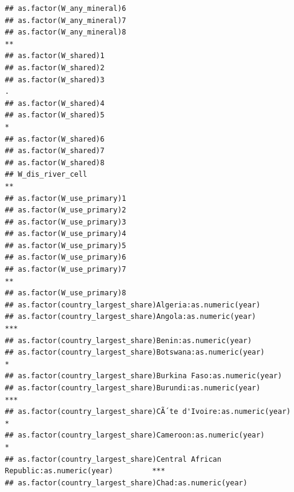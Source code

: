 \documentclass[
  a4paper,
]{article}
\begin{document}
\begin{verbatim}
## as.factor(W_any_mineral)6                                                            
## as.factor(W_any_mineral)7                                                            
## as.factor(W_any_mineral)8                                                         ** 
## as.factor(W_shared)1                                                                 
## as.factor(W_shared)2                                                                 
## as.factor(W_shared)3                                                              .  
## as.factor(W_shared)4                                                                 
## as.factor(W_shared)5                                                              *  
## as.factor(W_shared)6                                                                 
## as.factor(W_shared)7                                                                 
## as.factor(W_shared)8                                                                 
## W_dis_river_cell                                                                  ** 
## as.factor(W_use_primary)1                                                            
## as.factor(W_use_primary)2                                                            
## as.factor(W_use_primary)3                                                            
## as.factor(W_use_primary)4                                                            
## as.factor(W_use_primary)5                                                            
## as.factor(W_use_primary)6                                                            
## as.factor(W_use_primary)7                                                         ** 
## as.factor(W_use_primary)8                                                            
## as.factor(country_largest_share)Algeria:as.numeric(year)                             
## as.factor(country_largest_share)Angola:as.numeric(year)                           ***
## as.factor(country_largest_share)Benin:as.numeric(year)                               
## as.factor(country_largest_share)Botswana:as.numeric(year)                         *  
## as.factor(country_largest_share)Burkina Faso:as.numeric(year)                        
## as.factor(country_largest_share)Burundi:as.numeric(year)                          ***
## as.factor(country_largest_share)CÃ´te d'Ivoire:as.numeric(year)                   *  
## as.factor(country_largest_share)Cameroon:as.numeric(year)                         *  
## as.factor(country_largest_share)Central African Republic:as.numeric(year)         ***
## as.factor(country_largest_share)Chad:as.numeric(year)                                

\end{verbatim}
\end{document}
